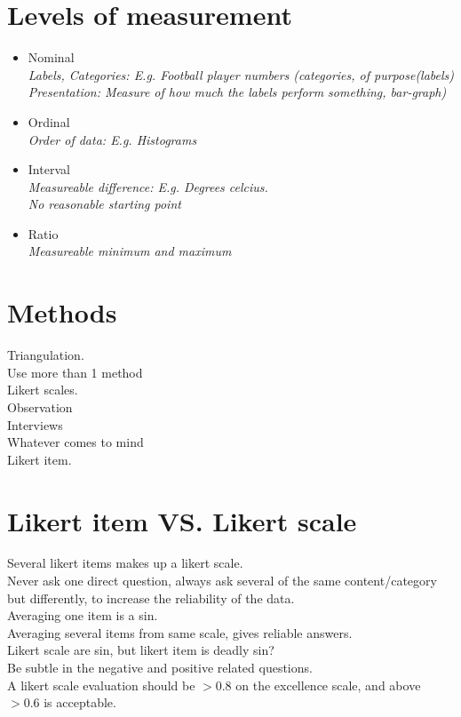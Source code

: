 \documentclass{article}
\begin{document}
\section{Levels of measurement}
\begin{itemize}
    \item Nominal\\
        \textit{Labels, Categories: E.g. Football player numbers (categories, of purpose(labels)\\Presentation: Measure of how much the labels perform something, bar-graph)}
    \item Ordinal\\
        \textit{Order of data: E.g. Histograms}
    \item Interval\\
        \textit{Measureable difference: E.g. Degrees celcius.\\No reasonable starting point}
    \item Ratio\\
        \textit{Measureable minimum and maximum}
\end{itemize}

\section{Methods}
Triangulation.\\
Use more than 1 method\\
Likert scales.\\
Observation\\
Interviews\\
Whatever comes to mind\\
Likert item.\\

\section{Likert item VS. Likert scale}
Several likert items makes up a likert scale.\\
Never ask one direct question, always ask several of the same content/category but differently, to increase the reliability of the data.\\
Averaging one item is a sin.\\
Averaging several items from same scale, gives reliable answers.\\
Likert scale are sin, but likert item is deadly sin?\\
Be subtle in the negative and positive related questions.\\
A likert scale evaluation should be $> 0.8$ on the excellence scale, and above $> 0.6$ is acceptable.
\end{document}
